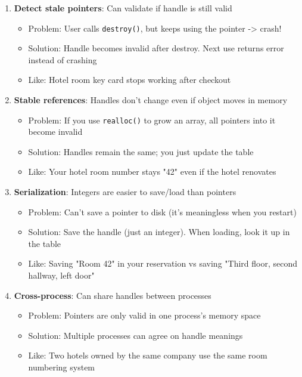 \begin{enumerate}
    \item \textbf{Detect stale pointers}: Can validate if handle is still valid
    \begin{itemize}
        \item Problem: User calls \texttt{destroy()}, but keeps using the pointer -> crash!
        \item Solution: Handle becomes invalid after destroy. Next use returns error instead of crashing
        \item Like: Hotel room key card stops working after checkout
    \end{itemize}

    \item \textbf{Stable references}: Handles don't change even if object moves in memory
    \begin{itemize}
        \item Problem: If you use \texttt{realloc()} to grow an array, all pointers into it become invalid
        \item Solution: Handles remain the same; you just update the table
        \item Like: Your hotel room number stays "42" even if the hotel renovates
    \end{itemize}

    \item \textbf{Serialization}: Integers are easier to save/load than pointers
    \begin{itemize}
        \item Problem: Can't save a pointer to disk (it's meaningless when you restart)
        \item Solution: Save the handle (just an integer). When loading, look it up in the table
        \item Like: Saving "Room 42" in your reservation vs saving "Third floor, second hallway, left door"
    \end{itemize}

    \item \textbf{Cross-process}: Can share handles between processes
    \begin{itemize}
        \item Problem: Pointers are only valid in one process's memory space
        \item Solution: Multiple processes can agree on handle meanings
        \item Like: Two hotels owned by the same company use the same room numbering system
    \end{itemize}


\end{enumerate}

